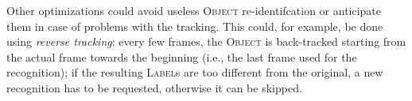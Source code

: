 \documentclass{beamer}
\begin{document}
  \begin{frame}
    \frametitle{\insertsection}
    Other optimizations could avoid useless \textsc{Object} re-identifcation or
    anticipate them in case of problems with the tracking. This could, for
    example, be done using \emph{reverse tracking}: every few frames, the
    \textsc{Object} is back-tracked starting from the actual frame towards the
    beginning (i.e., the last frame used for the recognition); if the resulting
    \textsc{Label}s are too different from the original, a new recognition has
    to be requested, otherwise it can be skipped.\\
  \end{frame}
\end{document}
